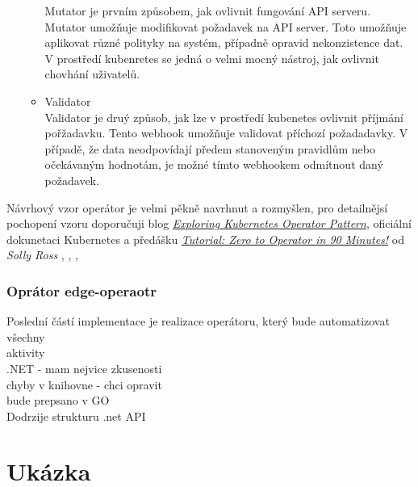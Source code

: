 \begin{itemize}
\begin{itemize}
        Mutator je prvním způsobem, jak ovlivnit fungování API serveru. Mutator umožňuje modifikovat požadavek na API server. Toto umožňuje aplikovat různé polityky na systém, případně opravid nekonzistence dat. V prostředí kubenretes se jedná o velmi mocný nástroj, jak ovlivnit chovhání uživatelů.  
        \item Validator\\
        Validator je druý způsob, jak lze v prostředí kubenetes ovlivnit příjmání pořžadavku. Tento webhook umožňuje validovat příchozí požadadavky. V případě, že data neodpovídají předem stanoveným pravidlům nebo očekávaným hodnotám, je možné tímto webhookem odmítnout daný požadavek.
    \end{itemize}
\end{itemize}
Návrhový vzor operátor je velmi pěkně navrhnut a rozmyšlen, pro detailnějsí pochopení vzoru doporučuji blog \href{https://iximiuz.com/en/posts/kubernetes-operator-pattern/}{\textit{Exploring Kubernetes Operator Pattern}}, oficiální dokunetaci Kubernetes a předášku \href{https://youtu.be/KBTXBUVNF2I}{\textit{Tutorial: Zero to Operator in 90 Minutes!}} od \textit{Solly Ross}
\cite{bhler_2021_kubeops},
\cite{kaplan_2022_argocd},
\cite{velichko_2021_exploring},
\cite{cncfcloudnativecomputingfoundation_2020_tutorial}

\subsubsection{Oprátor edge-operaotr}
Poslední částí implementace je realizace operátoru, který bude automatizovat všechny\\
aktivity\\
.NET - mam nejvice zkusenosti\\
chyby v knihovne - chci opravit\\
bude prepsano v GO\\
Dodrzije strukturu .net API\\

\section{Ukázka}
